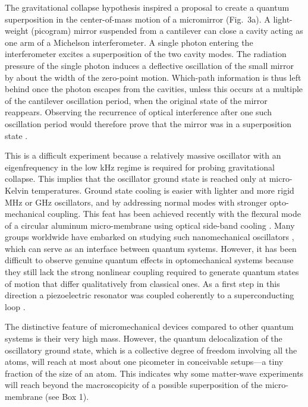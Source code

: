 \documentclass[12pt]{article}
\begin{document}
The  gravitational collapse hypothesis \cite{Penrose1996} inspired a proposal to create a quantum superposition in the center-of-mass motion of a micromirror \cite{Marshall2003} (Fig.~3a). A light-weight (picogram) mirror suspended from a cantilever can close a cavity acting as one arm of a Michelson interferometer.
A single photon entering the interferometer excites a superposition of the two cavity modes. 
The  radiation pressure of the single photon induces a deflective oscillation of the small mirror by about the width of the zero-point motion.
Which-path information is thus left behind once the photon escapes from the cavities, unless this occurs at a multiple of the cantilever oscillation period, when the original state of the mirror reappears.
Observing the recurrence of optical interference after one such oscillation period  would therefore prove that the mirror was in a superposition state \cite{Marshall2003,Bose1999a}.

This is a difficult experiment because a relatively massive oscillator with an eigenfrequency in the low kHz regime is required
for probing gravitational collapse.  
This implies that the oscillator ground state is reached only at micro-Kelvin temperatures. Ground state cooling is easier with lighter and more rigid MHz or GHz oscillators, and by addressing normal modes with stronger opto-mechanical coupling. This feat has been achieved recently with the flexural mode
of a circular aluminum micro-membrane using optical side-band cooling \cite{Teufel2011_long,Chan2011}.
Many groups worldwide have embarked on studying
such nanomechanical oscillators \cite{aspelmeyer2013cavity},
which can serve as an interface between quantum systems. However, it has been difficult to observe genuine quantum effects in optomechanical systems because they still lack the strong nonlinear coupling  required to generate quantum states of motion that differ qualitatively from classical ones. As a first step in this direction a piezoelectric resonator was coupled coherently to a superconducting loop \cite{OConnell2010_long}.



The distinctive feature of micromechanical devices compared to other quantum systems is their very high mass. However, the quantum delocalization of the oscillatory ground state,
which is a collective degree of freedom involving all the atoms,
will reach at most about one picometer in conceivable setups---a tiny fraction of the size of an atom.
This indicates why some matter-wave experiments will reach beyond the macroscopicity  of a possible superposition of the micro-membrane (see Box 1).
\end{document}
